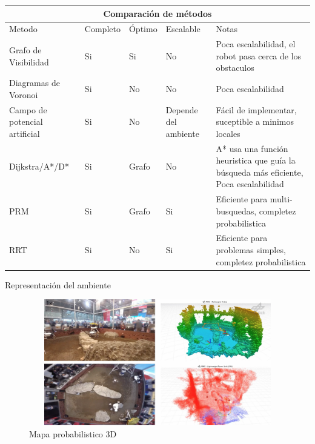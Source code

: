 \documentclass[
	11pt, %
]{beamer}
\begin{document}
\begin{frame}{}
  \centering
  \begin{tabular}{ |p{1.5cm}||p{0.8cm}|p{0.8cm}|p{1.2cm}|p{5cm}|  }
    \hline
    \multicolumn{5}{|c|}{\tiny Comparaci\'{o}n de m\'{e}todos} \\
    \hline 
    \tiny Metodo& \tiny Completo & \tiny \'{O}ptimo& \tiny Escalable& \tiny Notas \\
    \hline
    \tiny Grafo de Visibilidad   & \tiny Si    & \tiny Si&   \tiny No& \tiny Poca escalabilidad, el robot pasa cerca de los obstaculos\\
    \hline
    \tiny Diagramas de Voronoi   & \tiny Si    & \tiny No&   \tiny No& \tiny Poca escalabilidad\\
    \hline
    \tiny Campo de potencial artificial & \tiny Si    & \tiny No&   \tiny Depende del ambiente& \tiny F\'{a}cil de implementar, suceptible a minimos locales\\
    \hline
    \tiny Dijkstra/A*/D* & \tiny Si    & \tiny Grafo&   \tiny No& \tiny A* usa una función heuristica que guía la búsqueda más eficiente, Poca escalabilidad\\
    \hline
    \tiny PRM   & \tiny Si    & \tiny Grafo&   \tiny Si&  \tiny Eficiente para multi-busquedas, completez probabilistica \\
    \hline
    \tiny RRT   & \tiny Si    & \tiny No&   \tiny Si&  \tiny Eficiente para problemas simples, completez probabilistica\\
    \hline
  \end{tabular}  
\end{frame}

\begin{frame}{Representación del ambiente}

  \begin{figure}
    \centering
    \includegraphics[width=12cm, height=5.5cm]{octomaps}
    \caption[Caption for LOF]{Mapa probabilistico 3D\protect\footnotemark}
  \end{figure}
  
\end{frame}
\end{document}
